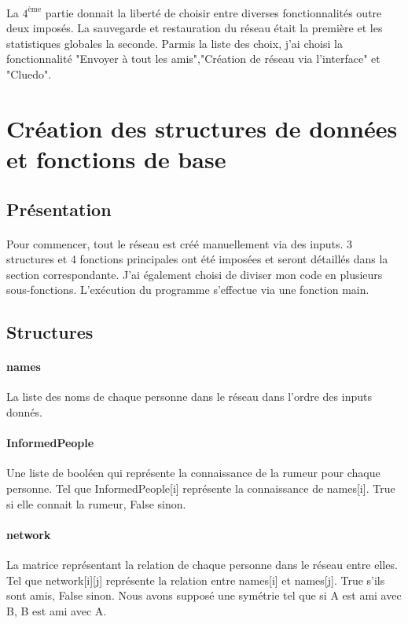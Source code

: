 \documentclass[a4paper,11pt]{article}
\begin{document}
\paragraph{}
{La $4^{\textrm{ème}}$ partie donnait la liberté de choisir entre diverses fonctionnalités outre deux imposés. La sauvegarde et restauration du réseau était la première 
et les statistiques globales la seconde. Parmis la liste des choix, j'ai choisi la fonctionnalité "Envoyer à tout les amis","Création de réseau via l'interface" et "Cluedo".}
\newpage
\section{Création des structures de données et fonctions de base }

\subsection{Présentation}
\paragraph{}
{Pour commencer, tout le réseau est créé manuellement via des inputs.
3 structures et 4 fonctions principales ont été imposées et seront détaillés dans la section correspondante.
J'ai également choisi de diviser mon code en plusieurs sous-fonctions.
L'exécution du programme s'effectue via une fonction main.}
\subsection{Structures}
\paragraph{names\newline}
{La liste des noms de chaque personne dans le réseau dans l'ordre des inputs donnés.}
\paragraph{InformedPeople\newline}
{Une liste de booléen qui représente la connaissance de la rumeur pour chaque personne.
Tel que InformedPeople[i] représente la connaissance de names[i]. True si elle connait la rumeur, False sinon.}
\paragraph{network\newline}
{La matrice représentant la relation de chaque personne dans le réseau entre elles.
Tel que network[i][j] représente la relation entre names[i] et names[j]. True s'ils sont amis, False sinon.
Nous avons supposé une symétrie tel que si A est ami avec B, B est ami avec A.}
\end{document}
